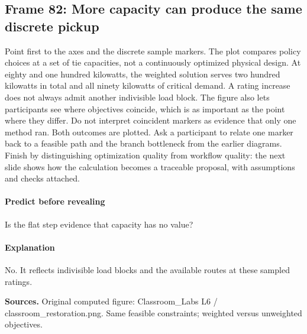 \documentclass[11pt]{article}
\begin{document}
\subsection*{Frame 82: More capacity can produce the same discrete pickup}
Point first to the axes and the discrete sample markers. The plot compares policy choices at a set of tie capacities, not a continuously optimized physical design. At eighty and one hundred kilowatts, the weighted solution serves two hundred kilowatts in total and all ninety kilowatts of critical demand. A rating increase does not always admit another indivisible load block. The figure also lets participants see where objectives coincide, which is as important as the point where they differ. Do not interpret coincident markers as evidence that only one method ran. Both outcomes are plotted. Ask a participant to relate one marker back to a feasible path and the branch bottleneck from the earlier diagrams. Finish by distinguishing optimization quality from workflow quality: the next slide shows how the calculation becomes a traceable proposal, with assumptions and checks attached.\par
\paragraph{Predict before revealing}Is the flat step evidence that capacity has no value?
\paragraph{Explanation}No. It reflects indivisible load blocks and the available routes at these sampled ratings.
\par\nopagebreak\begin{minipage}{\linewidth}{\footnotesize\color{slate}\textbf{Sources.} Original computed figure: Classroom\_Labs L6 / classroom\_restoration.png. Same feasible constraints; weighted versus unweighted objectives.\par}\end{minipage}\par\medskip
\end{document}
